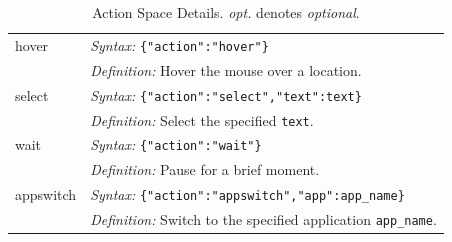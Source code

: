 \begin{table}[h!]
\begin{tabular}{@{}ll@{}}
hover & 
\textit{Syntax:} 
\texttt{\{"action":"hover"\}} \\
      & \textit{Definition:} Hover the mouse over a location. \\
\hline %
select & 
\textit{Syntax:} 
\texttt{\{"action":"select","text":text\}} \\
       & \textit{Definition:} Select the specified \texttt{text}. \\
\hline %
wait & 
\textit{Syntax:}
\texttt{\{"action":"wait"\}} \\
     & \textit{Definition:} Pause for a brief moment. \\
\hline %
appswitch & 
\textit{Syntax:} 
\texttt{\{"action":"appswitch","app":app\_name\}} \\
          & \textit{Definition:} Switch to the specified application \texttt{app\_name}.\\
\hline %
\end{tabular}
\caption{Action Space Details. \textit{opt.} denotes \textit{optional}.}
\label{tab:action_details_custom}
\end{table}
